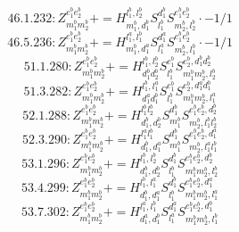 \documentclass[letterpaper,10pt,fleqn,leqno,onecolumn]{article}
\begin{document}
\begin{equation} \;\;\;\;\;\;  46.1.232: Z^{e_{1}^{b}e_{2}^{b}}_{m_{1}^{b}m_{2}^{b}}+=H^{l_{1}^{b},l_{2}^{b}}_{m_{1}^{b},d_{1}^{b}}S^{d_{1}^{b}}_{l_{1}^{b}}S^{e_{1}^{b}e_{2}^{b}}_{m_{2}^{b},l_{2}^{b}}\cdot -1/1 \end{equation}
\begin{equation} \;\;\;\;\;\;  46.5.236: Z^{e_{1}^{b}e_{2}^{b}}_{m_{1}^{b}m_{2}^{b}}+=H^{l_{1}^{a},l_{1}^{b}}_{m_{1}^{b},d_{1}^{a}}S^{d_{1}^{a}}_{l_{1}^{a}}S^{e_{1}^{b}e_{2}^{b}}_{m_{2}^{b},l_{1}^{b}}\cdot -1/1 \end{equation}
\begin{equation} \;\;\;\;\;\;  51.1.280: Z^{e_{1}^{b}e_{2}^{b}}_{m_{1}^{b}m_{2}^{b}}+=H^{l_{1}^{b},l_{2}^{b}}_{d_{1}^{b}d_{2}^{b}}S^{e_{1}^{b}}_{l_{1}^{b}}S^{e_{2}^{b},d_{1}^{b}d_{2}^{b}}_{m_{1}^{b}m_{2}^{b},l_{2}^{b}} \end{equation}
\begin{equation} \;\;\;\;\;\;  51.3.282: Z^{e_{1}^{b}e_{2}^{b}}_{m_{1}^{b}m_{2}^{b}}+=H^{l_{1}^{b},l_{1}^{a}}_{d_{1}^{a}d_{1}^{b}}S^{e_{1}^{b}}_{l_{1}^{b}}S^{e_{2}^{b},d_{1}^{a}d_{1}^{b}}_{m_{1}^{b}m_{2}^{b},l_{1}^{a}} \end{equation}
\begin{equation} \;\;\;\;\;\;  52.1.288: Z^{e_{1}^{b}e_{2}^{b}}_{m_{1}^{b}m_{2}^{b}}+=H^{l_{1}^{b}l_{2}^{b}}_{d_{1}^{b},d_{2}^{b}}S^{d_{1}^{b}}_{m_{1}^{b}}S^{e_{1}^{b}e_{2}^{b},d_{2}^{b}}_{m_{2}^{b},l_{1}^{b}l_{2}^{b}} \end{equation}
\begin{equation} \;\;\;\;\;\;  52.3.290: Z^{e_{1}^{b}e_{2}^{b}}_{m_{1}^{b}m_{2}^{b}}+=H^{l_{1}^{a}l_{1}^{b}}_{d_{1}^{b},d_{1}^{a}}S^{d_{1}^{b}}_{m_{1}^{b}}S^{e_{1}^{b}e_{2}^{b},d_{1}^{a}}_{m_{2}^{b},l_{1}^{a}l_{1}^{b}} \end{equation}
\begin{equation} \;\;\;\;\;\;  53.1.296: Z^{e_{1}^{b}e_{2}^{b}}_{m_{1}^{b}m_{2}^{b}}+=H^{l_{1}^{b},l_{2}^{b}}_{d_{1}^{b},d_{2}^{b}}S^{d_{1}^{b}}_{l_{1}^{b}}S^{e_{1}^{b}e_{2}^{b},d_{2}^{b}}_{m_{1}^{b}m_{2}^{b},l_{2}^{b}} \end{equation}
\begin{equation} \;\;\;\;\;\;  53.4.299: Z^{e_{1}^{b}e_{2}^{b}}_{m_{1}^{b}m_{2}^{b}}+=H^{l_{1}^{b},l_{1}^{a}}_{d_{1}^{b},d_{1}^{a}}S^{d_{1}^{b}}_{l_{1}^{b}}S^{e_{1}^{b}e_{2}^{b},d_{1}^{a}}_{m_{1}^{b}m_{2}^{b},l_{1}^{a}} \end{equation}
\begin{equation} \;\;\;\;\;\;  53.7.302: Z^{e_{1}^{b}e_{2}^{b}}_{m_{1}^{b}m_{2}^{b}}+=H^{l_{1}^{a},l_{1}^{b}}_{d_{1}^{a},d_{1}^{b}}S^{d_{1}^{a}}_{l_{1}^{a}}S^{e_{1}^{b}e_{2}^{b},d_{1}^{b}}_{m_{1}^{b}m_{2}^{b},l_{1}^{b}} \end{equation}
\end{document}
